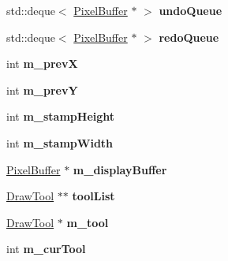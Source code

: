 \begin{DoxyCompactItemize}
{{\item 
\hypertarget{classFlashPhotoApp_abdb0f4d46432039c14d5816abb019fa7}{std\-::deque$<$ \hyperlink{classPixelBuffer}{Pixel\-Buffer} $\ast$ $>$ {\bfseries undo\-Queue}}\label{classFlashPhotoApp_abdb0f4d46432039c14d5816abb019fa7}

\item 
\hypertarget{classFlashPhotoApp_a67142e2e575f5c63666b3e750279fd4f}{std\-::deque$<$ \hyperlink{classPixelBuffer}{Pixel\-Buffer} $\ast$ $>$ {\bfseries redo\-Queue}}\label{classFlashPhotoApp_a67142e2e575f5c63666b3e750279fd4f}

\item 
\hypertarget{classFlashPhotoApp_a7552f6cf6441c53d020e5a0124031bcb}{int {\bfseries m\-\_\-prev\-X}}\label{classFlashPhotoApp_a7552f6cf6441c53d020e5a0124031bcb}

\item 
\hypertarget{classFlashPhotoApp_a6a9759bdfbdf16bf0091f1694604a64a}{int {\bfseries m\-\_\-prev\-Y}}\label{classFlashPhotoApp_a6a9759bdfbdf16bf0091f1694604a64a}

\item 
\hypertarget{classFlashPhotoApp_a2e397b37bfb3ea981efc795b7a2a9e9e}{int {\bfseries m\-\_\-stamp\-Height}}\label{classFlashPhotoApp_a2e397b37bfb3ea981efc795b7a2a9e9e}

\item 
\hypertarget{classFlashPhotoApp_a7dab8bf3eb60e4c99310660c9c32f3a5}{int {\bfseries m\-\_\-stamp\-Width}}\label{classFlashPhotoApp_a7dab8bf3eb60e4c99310660c9c32f3a5}

\item 
\hypertarget{classFlashPhotoApp_a9662e1dbd6e003a62179eecba827e910}{\hyperlink{classPixelBuffer}{Pixel\-Buffer} $\ast$ {\bfseries m\-\_\-display\-Buffer}}\label{classFlashPhotoApp_a9662e1dbd6e003a62179eecba827e910}

\item 
\hypertarget{classFlashPhotoApp_a752ba29ca132a3fd4deaa3727946f7f6}{\hyperlink{classDrawTool}{Draw\-Tool} $\ast$$\ast$ {\bfseries tool\-List}}\label{classFlashPhotoApp_a752ba29ca132a3fd4deaa3727946f7f6}

\item 
\hypertarget{classFlashPhotoApp_a69d8dcf7147882964a6d2832bbab67e2}{\hyperlink{classDrawTool}{Draw\-Tool} $\ast$ {\bfseries m\-\_\-tool}}\label{classFlashPhotoApp_a69d8dcf7147882964a6d2832bbab67e2}

\item 
\hypertarget{classFlashPhotoApp_a4fe8a885ae7b5e698c40a7585b4e292d}{int {\bfseries m\-\_\-cur\-Tool}}\label{classFlashPhotoApp_a4fe8a885ae7b5e698c40a7585b4e292d}

}}
\end{DoxyCompactItemize}
